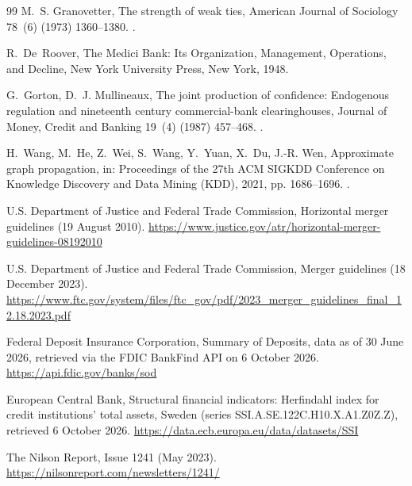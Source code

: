 \begin{thebibliography}{99}
M.~S. Granovetter, The strength of weak ties, American Journal of Sociology
78~(6) (1973) 1360--1380.
\newblock \href{https://doi.org/10.1086/225469}{}.

R.~De~Roover, The Medici Bank: Its Organization, Management, Operations, and
Decline, New York University Press, New York, 1948.

G.~Gorton, D.~J. Mullineaux, The joint production of confidence: Endogenous
regulation and nineteenth century commercial-bank clearinghouses, Journal of
Money, Credit and Banking 19~(4) (1987) 457--468.
\newblock \href{https://doi.org/10.2307/1992614}{}.

H.~Wang, M.~He, Z.~Wei, S.~Wang, Y.~Yuan, X.~Du, J.-R. Wen, Approximate graph
propagation, in: Proceedings of the 27th ACM SIGKDD Conference on Knowledge
Discovery and Data Mining (KDD), 2021, pp. 1686--1696.
\newblock \href{https://doi.org/10.1145/3447548.3467243}{}.

{U.S. Department of Justice and Federal Trade Commission}, Horizontal merger
guidelines (19 August 2010).
\newline\urlprefix\url{https://www.justice.gov/atr/horizontal-merger-guidelines-08192010}

{U.S. Department of Justice and Federal Trade Commission}, Merger guidelines
(18 December 2023).
\newline\urlprefix\url{https://www.ftc.gov/system/files/ftc_gov/pdf/2023_merger_guidelines_final_12.18.2023.pdf}

{Federal Deposit Insurance Corporation}, Summary of Deposits, data as of 30
June 2026, retrieved via the FDIC BankFind API on 6 October 2026.
\newline\urlprefix\url{https://api.fdic.gov/banks/sod}

{European Central Bank}, Structural financial indicators: Herfindahl index
for credit institutions' total assets, Sweden (series
SSI.A.SE.122C.H10.X.A1.Z0Z.Z), retrieved 6 October 2026.
\newline\urlprefix\url{https://data.ecb.europa.eu/data/datasets/SSI}

{The Nilson Report}, Issue 1241 (May 2023).
\newline\urlprefix\url{https://nilsonreport.com/newsletters/1241/}


\end{thebibliography}
